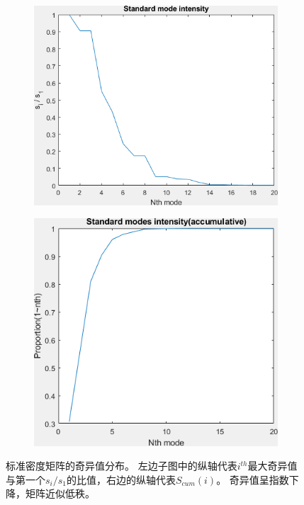 \documentclass[12pt]{article}
\begin{document}
\begin{figure}
	\begin{subfigure}{.5\textwidth}
		\centering
		\includegraphics[width=0.9\linewidth]{../figures/singular.png}  
		\label{fig:singular}
	\end{subfigure}
	\begin{subfigure}{.5\textwidth}
		\centering
		\includegraphics[width=.8\linewidth]{../figures/singular_accumative.png}  
		\label{fig:singular_acc}
	\end{subfigure}
	\caption{标准密度矩阵的奇异值分布。 左边子图中的纵轴代表$i^{th}$最大奇异值与第一个$s_i/s_1$的比值，右边的纵轴代表$S_{cum}(i)$。 奇异值呈指数下降，矩阵近似低秩。 }
	\label{fig:standard singular}
\end{figure}
\end{document}
